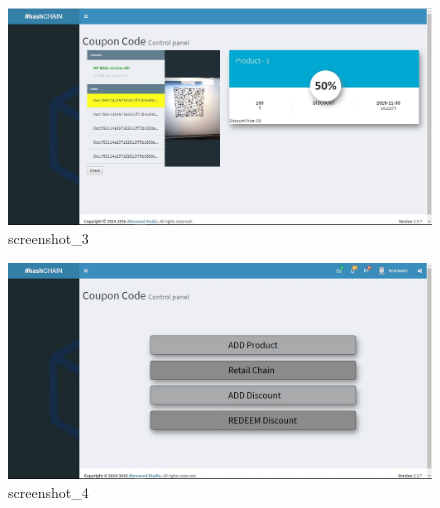 \begin{figure}[H]
    \includegraphics[scale=0.47]{screenshot_3}
    \caption{screenshot_3}
\end{figure}
\vspace{1cm}
\begin{figure}[H]
    \includegraphics[scale=0.47]{screenshot_4}
    \caption{screenshot_4}
\end{figure}





